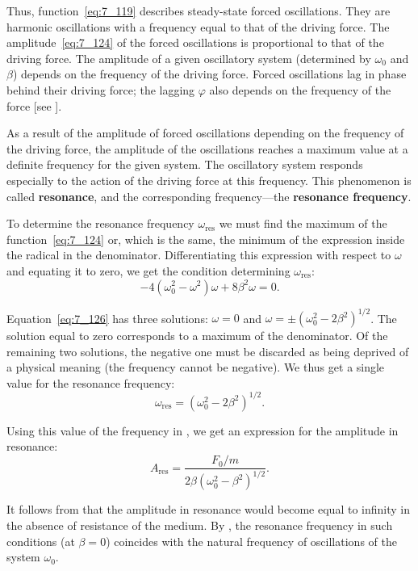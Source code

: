 Thus, function~\eqref{eq:7_119} describes steady-state forced oscillations. They are harmonic oscillations with a frequency equal to that of the driving force. The amplitude~\eqref{eq:7_124} of the forced oscillations is proportional to that of the driving force. The amplitude of a given oscillatory system (determined by $\omega_0$ and $\beta$) depends on the frequency of the driving force. Forced oscillations lag in phase behind their driving force; the lagging $\varphi$ also depends on the frequency of the force [see ].

As a result of the amplitude of forced oscillations depending on the frequency of the driving force, the amplitude of the oscillations reaches a maximum value at a definite frequency for the given system. The oscillatory system responds especially to the action of the driving force at this frequency. This phenomenon is called \textbf{resonance}, and the corresponding frequency---the \textbf{resonance frequency}.

To determine the resonance frequency $\omega_{\text{res}}$ we must find the maximum of the function~\eqref{eq:7_124} or, which is the same, the minimum of the expression inside the radical in the denominator. Differentiating this expression with respect to $\omega$ and equating it to zero, we get the condition determining $\omega_{\text{res}}$:
\begin{equation}\label{eq:7_126}
	-4\left(\omega_0^2 - \omega^2\right)\omega + 8\beta^2\omega = 0.
\end{equation}

Equation~\eqref{eq:7_126} has three solutions: $\omega=0$ and
$\omega=\pm\left(\omega_0^2-2\beta^2\right)^{1/2}$. The solution equal to zero corresponds to a maximum of the denominator. Of the remaining two solutions, the negative one must be discarded as being deprived of a physical meaning (the frequency cannot be negative). We thus get a single value for the resonance frequency:
\begin{equation}\label{eq:7_127}
	\omega_{\text{res}} = \left(\omega_0^2-2\beta^2\right)^{1/2}.
\end{equation}

\noindent
Using this value of the frequency in , we get an expression for the amplitude in resonance:
\begin{equation}\label{eq:7_128}
	A_{\text{res}} = \frac{F_0/m}{2\beta \left( \omega_0^2 - \beta^2\right)^{1/2}}.
\end{equation}

\noindent
It follows from  that the amplitude in resonance would become equal to infinity in the absence of resistance of the medium. By , the resonance frequency in such conditions (at $\beta=0$) coincides with the natural frequency of oscillations of the system $\omega_0$.

